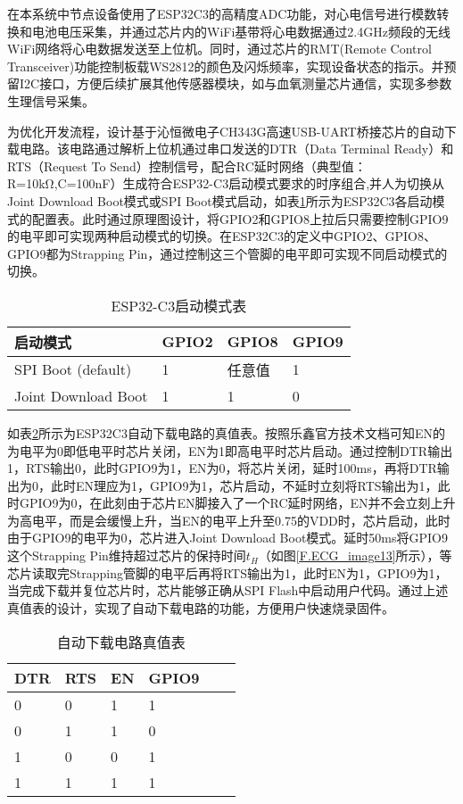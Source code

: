 在本系统中节点设备使用了ESP32C3的高精度ADC功能，对心电信号进行模数转换和电池电压采集，并通过芯片内的WiFi基带将心电数据通过2.4GHz频段的无线WiFi网络将心电数据发送至上位机。同时，通过芯片的RMT(Remote Control Transceiver)功能控制板载WS2812的颜色及闪烁频率，实现设备状态的指示。并预留I2C接口，方便后续扩展其他传感器模块，如与血氧测量芯片通信，实现多参数生理信号采集。

为优化开发流程，设计基于沁恒微电子CH343G高速USB-UART桥接芯片的自动下载电路。该电路通过解析上位机通过串口发送的DTR（Data Terminal Ready）和RTS（Request To Send）控制信号，配合RC延时网络（典型值：R=10kΩ,C=100nF）生成符合ESP32-C3启动模式要求的时序组合,并人为切换从Joint Download Boot模式或SPI Boot模式启动，如表\ref{T.ESP32C3-startmode}所示为ESP32C3各启动模式的配置表。此时通过原理图设计，将GPIO2和GPIO8上拉后只需要控制GPIO9的电平即可实现两种启动模式的切换。在ESP32C3的定义中GPIO2、GPIO8、GPIO9都为Strapping Pin，通过控制这三个管脚的电平即可实现不同启动模式的切换。

\begin{table}[htb]
    \centering
    \caption{ESP32-C3启动模式表}
    \label{T.ESP32C3-startmode}
    \begin{tabular}{llll}
    \hline
    启动模式 & GPIO2 & GPIO8 & GPIO9 \\
    \hline
    SPI Boot (default) & 1 & 任意值 & 1 \\
    \hline
    Joint Download Boot & 1 & 1 & 0 \\
    \hline
\end{tabular}
\end{table}

如表\ref{T.ESP32C3-autodownload}所示为ESP32C3自动下载电路的真值表。按照乐鑫官方技术文档\cite{espressif2021esp32c3}可知EN的为电平为0即低电平时芯片关闭，EN为1即高电平时芯片启动。通过控制DTR输出1，RTS输出0，此时GPIO9为1，EN为0，将芯片关闭，延时100ms，再将DTR输出为0，此时EN理应为1，GPIO9为1，芯片启动，不延时立刻将RTS输出为1，此时GPIO9为0，在此刻由于芯片EN脚接入了一个RC延时网络，EN并不会立刻上升为高电平，而是会缓慢上升，当EN的电平上升至0.75的VDD时，芯片启动，此时由于GPIO9的电平为0，芯片进入Joint Download Boot模式。延时50ms将GPIO9这个Strapping Pin维持超过芯片的保持时间$t_H$（如图\ref{F.ECG_image13}所示），等芯片读取完Strapping管脚的电平后再将RTS输出为1，此时EN为1，GPIO9为1，当完成下载并复位芯片时，芯片能够正确从SPI Flash中启动用户代码。通过上述真值表的设计，实现了自动下载电路的功能，方便用户快速烧录固件。

\begin{table}[htb]
    \centering
    \caption{自动下载电路真值表}
    \label{T.ESP32C3-autodownload}
    \begin{tabular}{llllll}
    \hline
    DTR & RTS & EN & GPIO9 \\
    \hline
    0 & 0 & 1 & 1 \\
    \hline
    0 & 1 & 1 & 0 \\
    \hline
    1 & 0 & 0 & 1 \\
    \hline
    1 & 1 & 1 & 1 \\
    \hline
\end{tabular}
\end{table}

